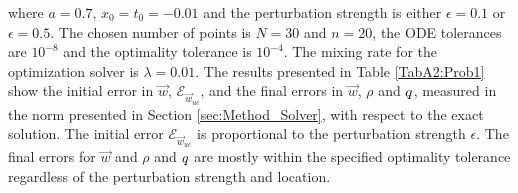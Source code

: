 where $a = 0.7$, $x_0 = t_0 = -0.01$ and the perturbation strength is either $\epsilon = 0.1$ or $\epsilon = 0.5$.
The chosen number of points is $N =30$ and $n=20$, the ODE tolerances are $10^{-8}$ and the optimality tolerance is $10^{-4}$. The mixing rate for the optimization solver is $\lambda = 0.01$.
The results presented in Table \ref{TabA2:Prob1} show the initial error in $\vec{w}$, $\mathcal{E}_{\vec{w}_{uc}}$, and the final errors in $\vec{w}$, $\rho$ and $q$, measured in the norm presented in Section \ref{sec:Method_Solver}, with respect to the exact solution. The initial error $\mathcal{E}_{\vec{w}_{uc}}$ is proportional to the perturbation strength $\epsilon$. The final errors for $\vec{w}$ and $\rho$ and $q$ are mostly within the specified optimality tolerance regardless of the perturbation strength and location. 


